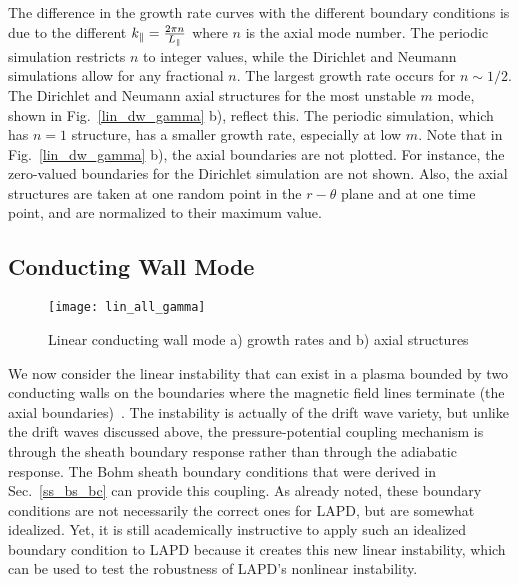 The difference in the growth rate curves with the different boundary conditions is due to the different $k_\parallel = \frac{2 \pi n}{L_\parallel}$ where $n$ is the axial mode number. The periodic simulation
restricts $n$ to integer values, while the Dirichlet and Neumann simulations allow for any fractional $n$. The largest growth rate occurs for $n \sim 1/2$. The Dirichlet and Neumann axial structures
for the most unstable $m$ mode, shown in Fig.~\ref{lin_dw_gamma} b), reflect this. The periodic simulation, which has $n=1$ structure, has a smaller growth rate, especially at low $m$. Note that in
Fig.~\ref{lin_dw_gamma} b), the axial boundaries are not plotted. For instance, the zero-valued boundaries for the Dirichlet simulation are not shown. Also, the axial structures are taken at one
random point in the $r-\theta$ plane and at one time point, and are normalized to their maximum value.

\subsection{Conducting Wall Mode}
\label{ss_cwm}

\begin{figure}[!ht]
\centerline{\texttt{[image: lin\_all\_gamma]}}
\caption{Linear conducting wall mode a) growth rates and b) axial structures}
\label{lin_all_gamma}
\end{figure}


We now consider the linear instability that can exist in a plasma bounded by two conducting walls on the boundaries where the magnetic field lines terminate
(the axial boundaries)~\cite{berk1991,berk1993,xu1993}.
The instability is actually of the drift wave variety, but unlike the drift waves discussed above, the pressure-potential coupling mechanism is through the sheath boundary response
rather than through the adiabatic response. The Bohm sheath boundary conditions that were derived in Sec.~\ref{ss_bs_bc} can provide this coupling. 
As already noted, these boundary conditions are not necessarily the correct ones
for LAPD, but are somewhat idealized. Yet, it is still academically instructive to apply such an idealized boundary condition to LAPD because it creates this new linear instability, which
can be used to test the robustness of LAPD's nonlinear instability.

